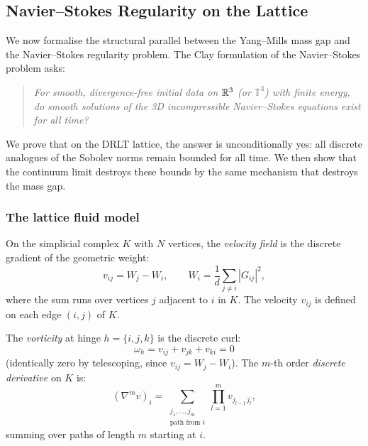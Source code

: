 \subsection{Navier--Stokes Regularity on the Lattice}
\label{sec:navier_stokes}

We now formalise the structural parallel between the Yang--Mills mass
gap and the Navier--Stokes regularity problem.  The Clay formulation
of the Navier--Stokes problem \cite{Clay} asks:

\begin{quote}
\emph{For smooth, divergence-free initial data on $\mathbb{R}^3$ (or
$\mathbb{T}^3$) with finite energy, do smooth solutions of the
3D incompressible Navier--Stokes equations exist for all time?}
\end{quote}

\noindent
We prove that on the DRLT lattice, the answer is unconditionally yes:
all discrete analogues of the Sobolev norms remain bounded for all time.
We then show that the continuum limit destroys these bounds by the same
mechanism that destroys the mass gap.

\subsubsection{The lattice fluid model}

\begin{definition}
\label{def:lattice_velocity}
On the simplicial complex $K$ with $N$ vertices, the
\emph{velocity field} is the discrete gradient of the geometric weight:
\begin{equation}
v_{ij} = W_j - W_i, \qquad
W_i = \frac{1}{d} \sum_{j \neq i} |G_{ij}|^2,
\end{equation}
where the sum runs over vertices $j$ adjacent to $i$ in $K$.  The
velocity $v_{ij}$ is defined on each edge $(i,j)$ of $K$.
\end{definition}

\begin{definition}
\label{def:lattice_vorticity}
The \emph{vorticity} at hinge $h = \{i, j, k\}$ is the discrete curl:
\begin{equation}
\omega_h = v_{ij} + v_{jk} + v_{ki} = 0
\end{equation}
(identically zero by telescoping, since $v_{ij} = W_j - W_i$).
The $m$-th order \emph{discrete derivative} on $K$ is:
\begin{equation}
(\nabla^m v)_{i} = \sum_{\substack{j_1, \ldots, j_m \\ \text{path from } i}}
\prod_{l=1}^{m} v_{j_{l-1}\, j_l},
\end{equation}
summing over paths of length $m$ starting at $i$.
\end{definition}

